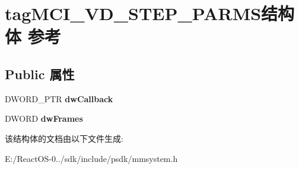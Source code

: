 \hypertarget{structtag_m_c_i___v_d___s_t_e_p___p_a_r_m_s}{}\section{tag\+M\+C\+I\+\_\+\+V\+D\+\_\+\+S\+T\+E\+P\+\_\+\+P\+A\+R\+M\+S结构体 参考}
\label{structtag_m_c_i___v_d___s_t_e_p___p_a_r_m_s}
\subsection*{Public 属性}
\begin{DoxyCompactItemize}
\item 
\mbox{\label{structtag_m_c_i___v_d___s_t_e_p___p_a_r_m_s_a66df51a9fb697673ef4615b881306c6f}} 
D\+W\+O\+R\+D\+\_\+\+P\+TR {\bfseries dw\+Callback}
\item 
\mbox{\label{structtag_m_c_i___v_d___s_t_e_p___p_a_r_m_s_aae28b594c8e9db5980474db5d78c48c3}} 
D\+W\+O\+RD {\bfseries dw\+Frames}
\end{DoxyCompactItemize}


该结构体的文档由以下文件生成\+:\begin{DoxyCompactItemize}
\item 
E\+:/\+React\+O\+S-\/0../sdk/include/psdk/mmsystem.\+h\end{DoxyCompactItemize}
